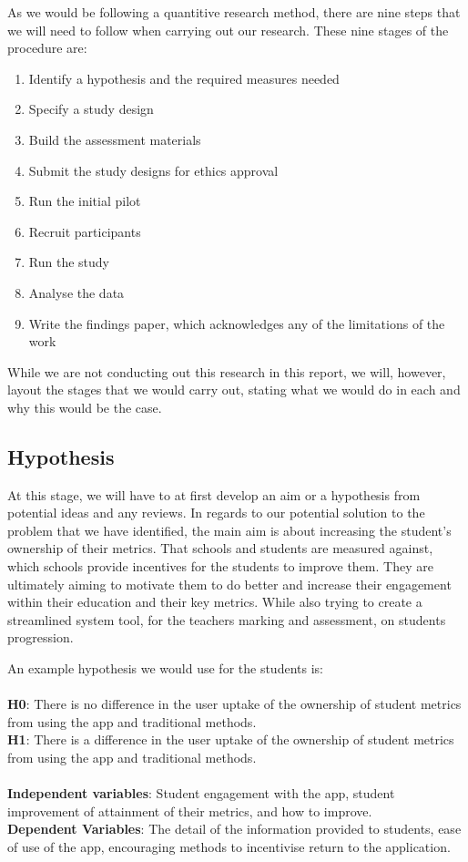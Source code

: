 \documentclass[sigchi]{acmart}
\begin{document}
As we would be following a quantitive research method, there are nine steps that we will need to follow when carrying out our research. These nine stages of the procedure are:

\begin{enumerate}
	
	\item Identify a hypothesis and the required measures needed
	\item Specify a study design
	\item Build the assessment materials
	\item Submit the study designs for ethics approval
	\item Run the initial pilot
	\item Recruit participants
	\item Run the study
	\item Analyse the data
	\item Write the findings paper, which acknowledges any of the limitations of the work
\end{enumerate}

While we are not conducting out this research in this report, we will, however, layout the stages that we would carry out, stating what we would do in each and why this would be the case. 

\subsection{Hypothesis}

At this stage, we will have to at first develop an aim or a hypothesis from potential ideas and any reviews. In regards to our potential solution to the problem that we have identified, the main aim is about increasing the student's ownership of their metrics. That schools and students are measured against, which schools provide incentives for the students to improve them. They are ultimately aiming to motivate them to do better and increase their engagement within their education and their key metrics. While also trying to create a streamlined system tool, for the teachers marking and assessment, on students progression.

An example hypothesis we would use for the students is:\\\\
\textbf{H0}: There is no difference in the user uptake of the ownership of student metrics from using the app and traditional methods.\\
\textbf{H1}: There is a difference in the user uptake of the ownership of student metrics from using the app and traditional methods.\\\\
\textbf{Independent variables}: Student engagement with the app, student improvement of attainment of their metrics, and how to improve.\\
\textbf{Dependent Variables}: The detail of the information provided to students, ease of use of the app, encouraging methods to incentivise return to the application.\\
\end{document}
